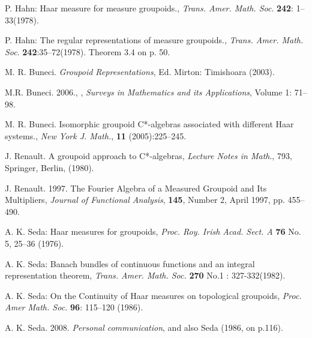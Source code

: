 \documentclass[12pt]{article}
\theoremstyle{plain}
\theoremstyle{definition}
\numberwithin{equation}{section}
\newcommand{\<}{{\langle}}
\begin{document}
\begin{thebibliography}{9}
      
P. Hahn: Haar measure for measure groupoids., \textit{Trans. Amer. Math. Soc}. \textbf{242}: 1--33(1978).

P. Hahn: The regular representations of measure groupoids., \textit{Trans. Amer. Math. Soc}. \textbf{242}:35--72(1978).
Theorem 3.4 on p. 50.

M. R. Buneci. \emph{Groupoid Representations}, Ed. Mirton: Timishoara (2003). 

M.R. Buneci. 2006.,
,
{\em Surveys in Mathematics and its Applications}, Volume 1: 71--98.

M. R. Buneci. Isomorphic groupoid C*-algebras associated with
different Haar systems., {\em New York J. Math.}, \textbf{11} (2005):225--245.

J. Renault. A groupoid approach to C*-algebras, \emph{Lecture Notes in Math}., 793, Springer,
Berlin, (1980).

J. Renault. 1997. The Fourier Algebra of a Measured Groupoid and Its Multipliers, 
{\em Journal of Functional Analysis}, \textbf{145}, Number 2, April 1997, pp. 455--490.
 
A. K. Seda: Haar measures for groupoids, \emph{Proc. Roy. Irish Acad.
Sect. A} \textbf{76} No. 5, 25--36 (1976).

A. K. Seda: Banach bundles of continuous functions and an integral
representation theorem, \emph{Trans. Amer. Math. Soc.} \textbf{270} No.1 : 327-332(1982).

A. K. Seda: On the Continuity of Haar measures on topological groupoids, \emph{Proc. Amer Math. Soc.} \textbf{96}: 115--120 (1986).

A. K. Seda. 2008. \emph{Personal communication}, and also Seda (1986, on p.116).
\end{thebibliography}
\end{document}
